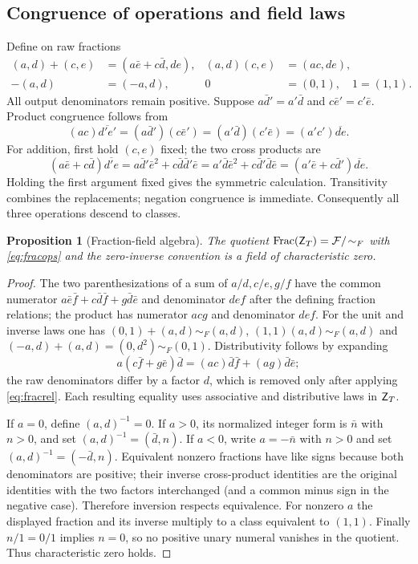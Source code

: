\documentclass[11pt,reqno]{amsart}
\newtheorem{proposition}[theorem]{Proposition}
\theoremstyle{definition}\newtheorem{definition}[theorem]{Definition}
\theoremstyle{remark}\newtheorem{remark}[theorem]{Remark}
\newcommand{\Frac}{\operatorname{Frac}}
\begin{document}
\subsection{Congruence of operations and field laws}\label{main:sub-16}
Define on raw fractions
\begin{align}\label{eq:fracops}
(a,d)+(c,e)&=(a\bar e+c\bar d,de),& (a,d)(c,e)&=(ac,de),\\
-(a,d)&=(-a,d),& 0&=(0,1),\quad 1=(1,1).
\end{align}
All output denominators remain positive. Suppose $a\bar d'=a'\bar d$ and $c\bar e'=c'\bar e$. Product congruence follows from
\[(ac)\overline{d'e'}=(a\bar d')(c\bar e')=(a'\bar d)(c'\bar e)=(a'c')\overline{de}.
\]
For addition, first hold $(c,e)$ fixed; the two cross products are
\[
(a\bar e+c\bar d)\overline{d'e}
=a\bar d'\bar e^2+c\bar d\bar d'\bar e
=a'\bar d\bar e^2+c\bar d'\bar d\bar e
=(a'\bar e+c\bar d')\overline{de}.
\]
Holding the first argument fixed gives the symmetric calculation. Transitivity combines the replacements; negation congruence is immediate. Consequently all three operations descend to classes.

\begin{proposition}[Fraction-field algebra]\label{prop:fracfield}
The quotient $\Frac(\Z)=\mathcal F/\!\sim_F$ with \eqref{eq:fracops} and the zero-inverse convention is a field of characteristic zero.
\end{proposition}
\begin{proof}
The two parenthesizations of a sum of $a/d,c/e,g/f$ have the common numerator $a\bar e\bar f+c\bar d\bar f+g\bar d\bar e$ and denominator $def$ after the defining fraction relations; the product has numerator $acg$ and denominator $def$. For the unit and inverse laws one has $(0,1)+(a,d)\sim_F(a,d)$, $(1,1)(a,d)\sim_F(a,d)$ and $(-a,d)+(a,d)=(0,d^2)\sim_F(0,1)$. Distributivity follows by expanding
\[a(c\bar f+g\bar e)\bar d=(ac)\bar d\bar f+(ag)\bar d\bar e;
\]
the raw denominators differ by a factor $d$, which is removed only after applying \eqref{eq:fracrel}. Each resulting equality uses associative and distributive laws in $\mathsf Z_T$.

If $a=0$, define $(a,d)^{-1}=0$. If $a>0$, its normalized integer form is $\bar n$ with $n>0$, and set $(a,d)^{-1}=(\bar d,n)$. If $a<0$, write $a=-\bar n$ with $n>0$ and set $(a,d)^{-1}=(-\bar d,n)$. Equivalent nonzero fractions have like signs because both denominators are positive; their inverse cross-product identities are the original identities with the two factors interchanged (and a common minus sign in the negative case). Therefore inversion respects equivalence. For nonzero $a$ the displayed fraction and its inverse multiply to a class equivalent to $(1,1)$. Finally $n/1=0/1$ implies $n=0$, so no positive unary numeral vanishes in the quotient. Thus characteristic zero holds.
\end{proof}
\end{document}
